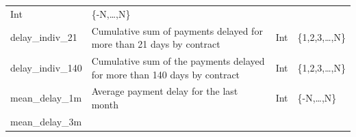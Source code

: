 \documentclass[
]{article}
\begin{document}
\begin{longtable}[]{@{}llll@{}}
\begin{minipage}[t]{0.11\columnwidth}
Int\strut
\end{minipage} & \begin{minipage}[t]{0.19\columnwidth}\raggedright
\{-N,\ldots,N\}\strut
\end{minipage}\tabularnewline
\begin{minipage}[t]{0.30\columnwidth}\raggedright
delay\_indiv\_21\strut
\end{minipage} & \begin{minipage}[t]{0.30\columnwidth}\raggedright
Cumulative sum of payments delayed for more than 21 days by contract\strut
\end{minipage} & \begin{minipage}[t]{0.11\columnwidth}\raggedright
Int\strut
\end{minipage} & \begin{minipage}[t]{0.19\columnwidth}\raggedright
\{1,2,3,\ldots,N\}\strut
\end{minipage}\tabularnewline
\begin{minipage}[t]{0.30\columnwidth}\raggedright
delay\_indiv\_140\strut
\end{minipage} & \begin{minipage}[t]{0.30\columnwidth}\raggedright
Cumulative sum of the payments delayed for more than 140 days by contract\strut
\end{minipage} & \begin{minipage}[t]{0.11\columnwidth}\raggedright
Int\strut
\end{minipage} & \begin{minipage}[t]{0.19\columnwidth}\raggedright
\{1,2,3,\ldots,N\}\strut
\end{minipage}\tabularnewline
\begin{minipage}[t]{0.30\columnwidth}\raggedright
mean\_delay\_1m\strut
\end{minipage} & \begin{minipage}[t]{0.30\columnwidth}\raggedright
Average payment delay for the last month\strut
\end{minipage} & \begin{minipage}[t]{0.11\columnwidth}\raggedright
Int\strut
\end{minipage} & \begin{minipage}[t]{0.19\columnwidth}\raggedright
\{-N,\ldots,N\}\strut
\end{minipage}\tabularnewline
\begin{minipage}[t]{0.30\columnwidth}\raggedright
mean\_delay\_3m\strut
\end{minipage} & \begin{minipage}[t]{0.30\columnwidth}\raggedright

\end{minipage}
\end{longtable}
\end{document}
